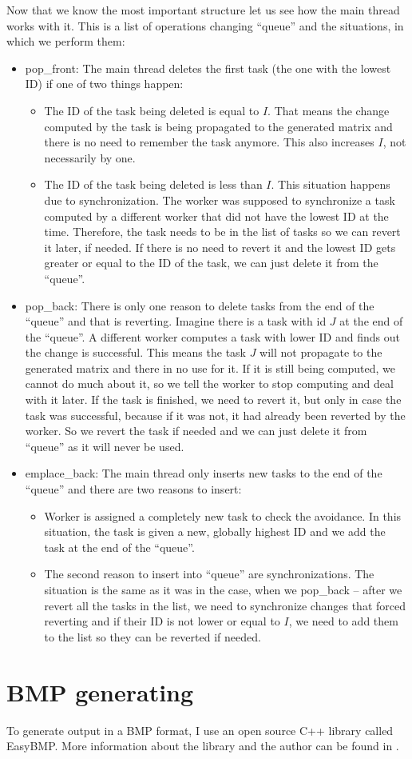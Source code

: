 Now that we know the most important structure let us see how the main thread works with it. This is a list of operations changing ``queue'' and the situations, in which we perform them:
\begin{itemize}
\item pop\_front: The main thread deletes the first task (the one with the lowest ID) if one of two things happen:
\begin{itemize}
\item The ID of the task being deleted is equal to $I$. That means the change computed by the task is being propagated to the generated matrix and there is no need to remember the task anymore. This also increases $I$, not necessarily by one.
\item The ID of the task being deleted is less than $I$. This situation happens due to synchronization. The worker was supposed to synchronize a task computed by a different worker that did not have the lowest ID at the time. Therefore, the task needs to be in the list of tasks so we can revert it later, if needed. If there is no need to revert it and the lowest ID gets greater or equal to the ID of the task, we can just delete it from the ``queue''.
\end{itemize}
\item pop\_back: There is only one reason to delete tasks from the end of the ``queue'' and that is reverting. Imagine there is a task with id $J$ at the end of the ``queue''. A different worker computes a task with lower ID and finds out the change is successful. This means the task $J$ will not propagate to the generated matrix and there in no use for it. If it is still being computed, we cannot do much about it, so we tell the worker to stop computing and deal with it later. If the task is finished, we need to revert it, but only in case the task was successful, because if it was not, it had already been reverted by the worker. So we revert the task if needed and we can just delete it from ``queue'' as it will never be used.
\item emplace\_back: The main thread only inserts new tasks to the end of the ``queue'' and there are two reasons to insert:
\begin{itemize}
\item Worker is assigned a completely new task to check the avoidance. In this situation, the task is given a new, globally highest ID and we add the task at the end of the ``queue''.
\item The second reason to insert into ``queue'' are synchronizations. The situation is the same as it was in the case, when we pop\_back -- after we revert all the tasks in the list, we need to synchronize changes that forced reverting and if their ID is not lower or equal to $I$, we need to add them to the list so they can be reverted if needed.
\end{itemize}
\end{itemize}

\section{BMP generating}
To generate output in a BMP format, I use an open source C++ library called EasyBMP. More information about the library and the author can be found in \cite{EasyBMP}.